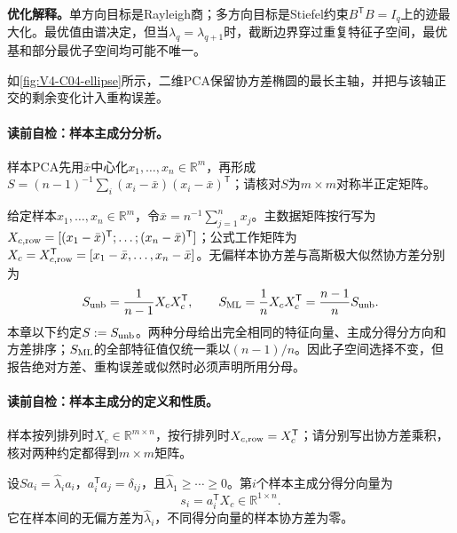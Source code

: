 \label{struct:V4-C04-CH16}
\begin{optimizationbox}
\textbf{优化解释。}单方向目标是Rayleigh商；多方向目标是Stiefel约束$B^{\mathsf T}B=I_q$上的迹最大化。最优值由谱决定，但当$\lambda_q=\lambda_{q+1}$时，截断边界穿过重复特征子空间，最优基和部分最优子空间均可能不唯一。
\end{optimizationbox}

\label{struct:V4-C04-CH17}
如\cref{fig:V4-C04-ellipse}所示，二维PCA保留协方差椭圆的最长主轴，并把与该轴正交的剩余变化计入重构误差。


\paragraph{读前自检：样本主成分分析。}样本PCA先用$\bar x$中心化$x_1,\ldots,x_n\in\mathbb R^m$，再形成$S=(n-1)^{-1}\sum_i(x_i-\bar x)(x_i-\bar x)^{\mathsf T}$；请核对$S$为$m\times m$对称半正定矩阵。\par

给定样本$x_1,\ldots,x_n\in\mathbb R^m$，令$\bar x=n^{-1}\sum_{j=1}^n x_j$。主数据矩阵按行写为
$X_{c,{\rm row}}=[(x_1-\bar x)^{\mathsf T};\ldots;(x_n-\bar x)^{\mathsf T}]$；公式工作矩阵为
$X_c=X_{c,{\rm row}}^{\mathsf T}=[x_1-\bar x,\ldots,x_n-\bar x]$。无偏样本协方差与高斯极大似然协方差分别为
\[
S_{\rm unb}=\frac{1}{n-1}X_cX_c^{\mathsf T},
\qquad
S_{\rm ML}=\frac{1}{n}X_cX_c^{\mathsf T}
=\frac{n-1}{n}S_{\rm unb}.
\]
本章以下约定$S:=S_{\rm unb}$。两种分母给出完全相同的特征向量、主成分得分方向和方差排序；$S_{\rm ML}$的全部特征值仅统一乘以$(n-1)/n$。因此子空间选择不变，但报告绝对方差、重构误差或似然时必须声明所用分母。

\paragraph{读前自检：样本主成分的定义和性质。}样本按列排列时$X_c\in\mathbb R^{m\times n}$，按行排列时$X_{c,{\rm row}}=X_c^{\mathsf T}$；请分别写出协方差乘积，核对两种约定都得到$m\times m$矩阵。\par

\begin{definition}[样本主成分]
设$S a_i=\widehat\lambda_i a_i$，$a_i^{\mathsf T}a_j=\delta_{ij}$，且$\widehat\lambda_1\ge\cdots\ge0$。第$i$个样本主成分得分向量为
\[
s_i=a_i^{\mathsf T}X_c\in\mathbb R^{1\times n}.
\]
它在样本间的无偏方差为$\widehat\lambda_i$，不同得分向量的样本协方差为零。
\end{definition}

